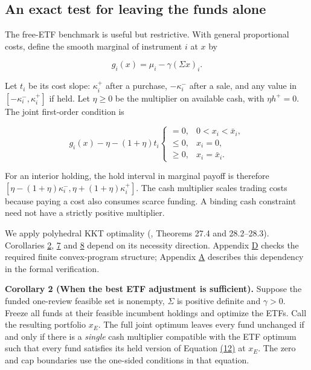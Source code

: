\documentclass[11pt]{article}
\begin{document}
\subsection{An exact test for leaving the funds alone}\label{sec:3.2}

The free-ETF benchmark is useful but restrictive. With general proportional costs, define the smooth marginal of instrument \(i\) at \(x\) by

\begin{equation*}
g_i(x)=\mu_i-\gamma(\Sigma x)_i.
\tag{11}\label{eq:11}
\end{equation*}

Let \(t_i\) be its cost slope: \(\kappa_i^+\) after a purchase, \(-\kappa_i^-\) after a sale, and any value in \([-\kappa_i^-,\kappa_i^+]\) if held. Let \(\eta\geq0\) be the multiplier on available cash, with \(\eta h^+=0\). The joint first-order condition is

\begin{equation*}
g_i(x)-\eta-(1+\eta)t_i
\begin{cases}
=0,&0<x_i<\bar x_i,\\
\leq0,&x_i=0,\\
\geq0,&x_i=\bar x_i.
\end{cases}
\tag{12}\label{eq:12}
\end{equation*}

For an interior holding, the hold interval in marginal payoff is therefore \([\eta-(1+\eta)\kappa_i^-,\eta+(1+\eta)\kappa_i^+]\). The cash multiplier scales trading costs because paying a cost also consumes scarce funding. A binding cash constraint need not have a strictly positive multiplier.

We apply polyhedral KKT optimality (\cite{rockafellar1970convex}, Theorems 27.4 and 28.2--28.3). Corollaries \hyperref[res:Corollary-2]{2}, \hyperref[res:Corollary-7]{7} and \hyperref[res:Corollary-8]{8} depend on its necessity direction. Appendix \hyperref[sec:D]{D} checks the required finite convex-program structure; Appendix \hyperref[sec:A]{A} describes this dependency in the formal verification.

\label{res:Corollary-2}
\textbf{Corollary 2 (When the best ETF adjustment is sufficient).} Suppose the funded one-review feasible set is nonempty, \(\Sigma\) is positive definite and \(\gamma>0\). Freeze all funds at their feasible incumbent holdings and optimize the ETFs. Call the resulting portfolio \(x_E\). The full joint optimum leaves every fund unchanged if and only if there is a \emph{single} cash multiplier compatible with the ETF optimum such that every fund satisfies its held version of Equation \hyperref[eq:12]{(12)} at \(x_E\). The zero and cap boundaries use the one-sided conditions in that equation.
\end{document}
